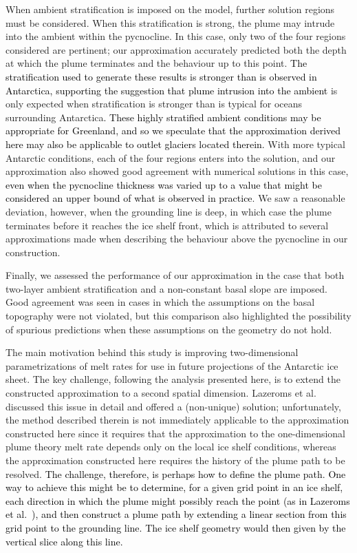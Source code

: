 \documentclass[openacc]{rsproca_new}%
\newcommand{\red}[1]{{\color{red} #1}}
\newcommand{\blue}[1]{{\color{blue} #1}}
\newcommand{\rout}[1]{\red{\st{#1}}}\newcommand{\ab}[1]{\textcolor{Green}{#1}}\newcommand{\about}[1]{\textcolor{Cyan}{\sout{#1}}}
\renewcommand{\rout}[1]{{}} %
\renewcommand{\blue}[1]{{\textcolor{black}{#1}}} %
\renewcommand{\red}[1]{{}} %
\begin{document}
When ambient stratification is imposed on the model, further solution regions must be considered. When this stratification is strong, the plume may intrude into the ambient within the pycnocline. In this case, only two of the four regions considered are pertinent; our approximation accurately predicted both the depth at which the plume terminates and the behaviour up to this point. \blue{The stratification used to generate these results is stronger than is observed in Antarctica, supporting the suggestion that plume intrusion into the ambient}\rout{ This behaviour} is only expected when stratification is stronger than is typical for oceans surrounding Antarctica\blue{. These highly stratified ambient conditions may be appropriate for Greenland, and so we speculate  that the approximation derived here may also be applicable to outlet glaciers located therein.} With more typical Antarctic conditions, each of the four regions enters into the solution, and our approximation also showed good agreement with numerical solutions in this case\blue{, even when the pycnocline thickness was varied up to a value that might be considered an upper bound of what is observed in practice}. We saw a reasonable deviation, however, when the grounding line is deep, in which case the plume terminates before it reaches the ice shelf front, which is attributed to several approximations made when describing the behaviour above the pycnocline in our construction.

Finally, we assessed the performance of our approximation in the case that both two-layer ambient stratification and a non-constant basal slope are imposed. Good agreement was seen in cases in which the assumptions on the basal topography were not violated, but this comparison also highlighted the possibility of spurious predictions when these assumptions on the geometry do not hold.

%
The main motivation behind this study is improving two-dimensional parametrizations of melt rates for use in future projections of the Antarctic ice sheet. The key challenge, following the analysis presented here, is to extend the constructed approximation to a second spatial dimension. \rout{Whilst this is beyond the scope of this paper, it should be noted that this presents a significant challenge.} Lazeroms et al.~\cite{Lazeroms2018TheCryo} discussed this issue in detail and offered a (non-unique) solution; unfortunately, the method described therein is not immediately applicable to the approximation constructed here since it requires that the approximation to the one-dimensional plume theory melt rate depends only on the local ice shelf conditions, whereas the approximation constructed here requires the history of the plume path to be resolved. \blue{The challenge, therefore, is perhaps how to define the plume path. One way to achieve this might be to determine, for a given grid point in an ice shelf, each direction in which the plume might possibly reach the point (as in Lazeroms et al.~\cite{Lazeroms2018TheCryo}), and then construct a plume path by extending a linear section from this grid point to the grounding line. The ice shelf geometry would then given by the vertical slice along this line. }
\end{document}
